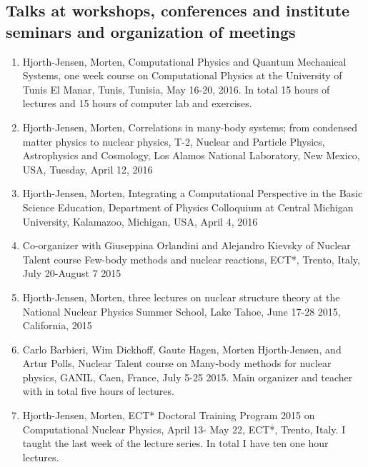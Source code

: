 \documentclass[prc,amsart,english,twocolumn,superscriptaddress,showpacs,floatfix]{revtex4}
\begin{document}
 \subsection*{Talks at workshops, conferences and institute seminars and organization of meetings}
\begin{enumerate}
\item Hjorth-Jensen, Morten, {Computational Physics and Quantum Mechanical Systems}, one week course on Computational Physics at the University of Tunis El Manar, Tunis, Tunisia, May 16-20, 2016. In total 15 hours of lectures and 15 hours of computer lab and exercises. 

\item Hjorth-Jensen, Morten, {Correlations in many-body systems; from condensed matter physics to nuclear physics}, T-2, Nuclear and Particle Physics, Astrophysics and Cosmology, Los Alamos National Laboratory, New Mexico, USA, Tuesday, April 12, 2016

\item Hjorth-Jensen, Morten, {Integrating a Computational Perspective in the Basic Science Education}, Department of Physics Colloquium at Central  Michigan University,  Kalamazoo, Michigan, USA, April 4, 2016

\item Co-organizer with Giuseppina Orlandini and Alejandro Kievsky of Nuclear Talent course {Few-body methods and nuclear reactions}, ECT*, Trento, Italy, July 20-August 7 2015

\item Hjorth-Jensen, Morten, three lectures on nuclear structure theory at the National Nuclear Physics Summer School, Lake Tahoe, June 17-28 2015, California, 2015

\item Carlo Barbieri, Wim Dickhoff, Gaute Hagen, Morten Hjorth-Jensen, and Artur Polls, Nuclear Talent course on Many-body methods for nuclear physics, GANIL, Caen, France, July 5-25 2015. {Main organizer and teacher with in total five hours of lectures}. 

\item Hjorth-Jensen, Morten, ECT* {Doctoral Training Program 2015 on Computational Nuclear Physics}, April 13- May 22, ECT*, Trento, Italy. I taught the last week of the lecture series. In total I have ten one hour lectures. 

\end{enumerate}
\end{document}
